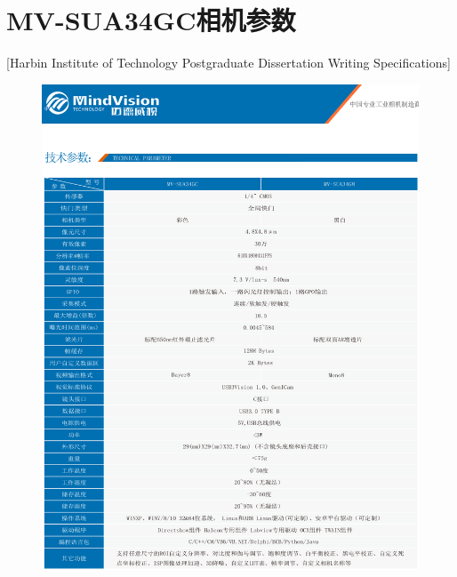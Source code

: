 \chapter[MV-SUA34GC相机参数]{MV-SUA34GC相机参数}[Harbin Institute of Technology Postgraduate Dissertation Writing Specifications]
\begin{figure}[htbp]
    \centering
    \includegraphics[width=\textwidth]{figures/camera.png}
  \end{figure}